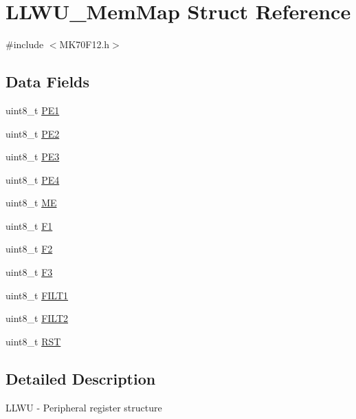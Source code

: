 \hypertarget{struct_l_l_w_u___mem_map}{}\section{L\+L\+W\+U\+\_\+\+Mem\+Map Struct Reference}
\label{struct_l_l_w_u___mem_map}


{\ttfamily \#include $<$M\+K70\+F12.\+h$>$}

\subsection*{Data Fields}
\begin{DoxyCompactItemize}
\item 
uint8\+\_\+t \hyperlink{struct_l_l_w_u___mem_map_abb0c4dd1142a84dc991e6dda4a8381d6}{P\+E1}
\item 
uint8\+\_\+t \hyperlink{struct_l_l_w_u___mem_map_a53d86f5153bce17f9927472da4fade5a}{P\+E2}
\item 
uint8\+\_\+t \hyperlink{struct_l_l_w_u___mem_map_a96a722e1ae66ee87b88407ef622cf243}{P\+E3}
\item 
uint8\+\_\+t \hyperlink{struct_l_l_w_u___mem_map_a61ec3534039e161c5c71ea7f290f23d5}{P\+E4}
\item 
uint8\+\_\+t \hyperlink{struct_l_l_w_u___mem_map_ae8dea688fae93c1a5f9dd22b70cdc5cf}{M\+E}
\item 
uint8\+\_\+t \hyperlink{struct_l_l_w_u___mem_map_acb7ec83bb70ec1313cd2e0682b1ee75c}{F1}
\item 
uint8\+\_\+t \hyperlink{struct_l_l_w_u___mem_map_a108405432abc40a34ccbb2c0d7ecfdb4}{F2}
\item 
uint8\+\_\+t \hyperlink{struct_l_l_w_u___mem_map_a47d12785dc2fc2afa376e2398c7619f1}{F3}
\item 
uint8\+\_\+t \hyperlink{struct_l_l_w_u___mem_map_a80ad19326e9bf7209c71d7955e4ef044}{F\+I\+L\+T1}
\item 
uint8\+\_\+t \hyperlink{struct_l_l_w_u___mem_map_a84fdf2d8e40d91c4ad620512aaca152b}{F\+I\+L\+T2}
\item 
uint8\+\_\+t \hyperlink{struct_l_l_w_u___mem_map_a95c7e36f114e8ac7f235ad8ef335f1cf}{R\+S\+T}
\end{DoxyCompactItemize}


\subsection{Detailed Description}
L\+L\+W\+U -\/ Peripheral register structure 

